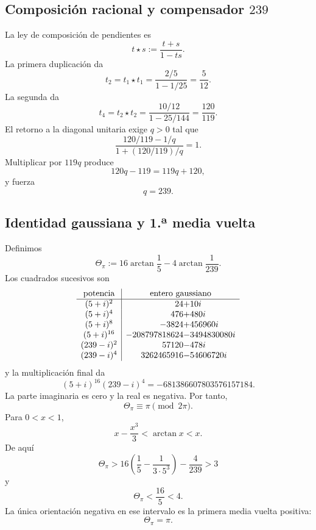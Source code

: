 \subsection{Composición racional y compensador \texorpdfstring{\(239\)}{239}}

La ley de composición de pendientes es
\[
 t\star s:=\frac{t+s}{1-ts}.
\]
La primera duplicación da
\[
 t_2=t_1\star t_1
 =\frac{2/5}{1-1/25}
 =\frac5{12}.
\]
La segunda da
\[
 t_4=t_2\star t_2
 =\frac{10/12}{1-25/144}
 =\frac{120}{119}.
\]
El retorno a la diagonal unitaria exige \(q>0\) tal que
\[
 \frac{120/119-1/q}{1+(120/119)/q}=1.
\]
Multiplicar por \(119q\) produce
\[
 120q-119=119q+120,
\]
y fuerza
\begin{equation}
 \boxed{q=239.}
 \label{p12-83-c9-s1:eq:compensador-239-pi}
\end{equation}

\subsection{Identidad gaussiana y 1.ª media vuelta}

Definimos
\begin{equation}
 \Theta_\pi
 :=16\arctan\frac15-4\arctan\frac1{239}.
 \label{p12-83-c9-s1:eq:theta-pi-autonoma}
\end{equation}
Los cuadrados sucesivos son
\[
\begin{array}{c|r@{}l}
\text{potencia}&\multicolumn{2}{c}{\text{entero gaussiano}}\\ \hline
(5+i)^2&24&+10i\\
(5+i)^4&476&+480i\\
(5+i)^8&-3824&+456960i\\
(5+i)^{16}&-208797818624&-3494830080i\\
(239-i)^2&57120&-478i\\
(239-i)^4&3262465916&-54606720i
\end{array}
\]
y la multiplicación final da
\begin{equation}
 \boxed{
 (5+i)^{16}(239-i)^4
 =-681386607803576157184.}
 \label{p12-83-c9-s1:eq:identidad-gaussiana-pi-autonoma}
\end{equation}
La parte imaginaria es cero y la real es negativa. Por tanto,
\[
 \Theta_\pi\equiv\pi\pmod{2\pi}.
\]
Para \(0<x<1\),
\[
 x-\frac{x^3}{3}<\arctan x<x.
\]
De aquí
\[
 \Theta_\pi>
 16\left(\frac15-\frac1{3\cdot5^3}\right)-\frac4{239}>3
\]
y
\[
 \Theta_\pi<\frac{16}{5}<4.
\]
La única orientación negativa en ese intervalo es la primera media vuelta
positiva:
\begin{equation}
 \boxed{\Theta_\pi=\pi.}
 \label{p12-83-c9-s1:eq:reconocimiento-pi-exacto}
\end{equation}

